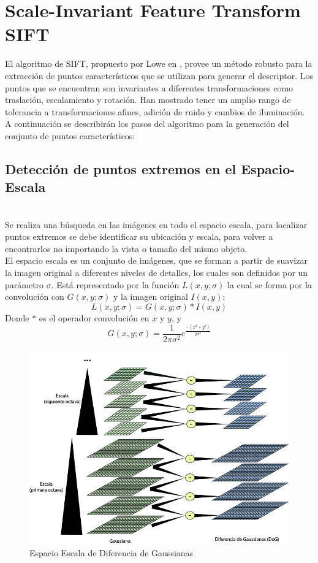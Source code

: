 
\chapter{Scale-Invariant Feature Transform SIFT}
	El algoritmo de SIFT, propuesto por Lowe en \cite{Lowe2004},  provee un método robusto para la extracción de puntos característicos que se utilizan para generar el descriptor. Los puntos que se encuentran son invariantes a diferentes transformaciones como traslación, escalamiento y rotación. Han mostrado tener un amplio rango de tolerancia a transformaciones afines, adición de ruido y cambios de iluminación. A continuación se describirán los pasos del algoritmo para la generación del conjunto de puntos característicos:

	\section{Detección de puntos extremos en el Espacio-Escala} \hfill \\
		Se realiza una búsqueda en las imágenes en todo el espacio escala, para localizar puntos extremos se debe identificar su ubicación y escala, para volver a encontrarlos no importando la vista o tamaño del mismo objeto.\\
		El espacio escala es un conjunto de imágenes, que se forman a partir de suavizar la imagen original a diferentes niveles de detalles, los cuales son definidos por un parámetro $\sigma$. Está representado por la función $L(x,y;\sigma)$ la cual se forma por la convolución con $G(x,y;\sigma)$ y la imagen original $I(x,y)$:
		$$L(x,y;\sigma) = G(x,y;\sigma) * I(x,y)$$
		Donde $*$ es el operador convolución en $x$ y $y$, y
		$$ G(x,y;\sigma) = \frac{1}{2\pi\sigma^2}e^{\frac{-(x^2+y^2)}{2\sigma^2}}$$
		\begin{figure}[h]
			\centering
				\includegraphics[scale=0.5]{img/spaceScale.jpg}
			\caption{Espacio Escala de Diferencia de Gaussianas}
		\end{figure}		
